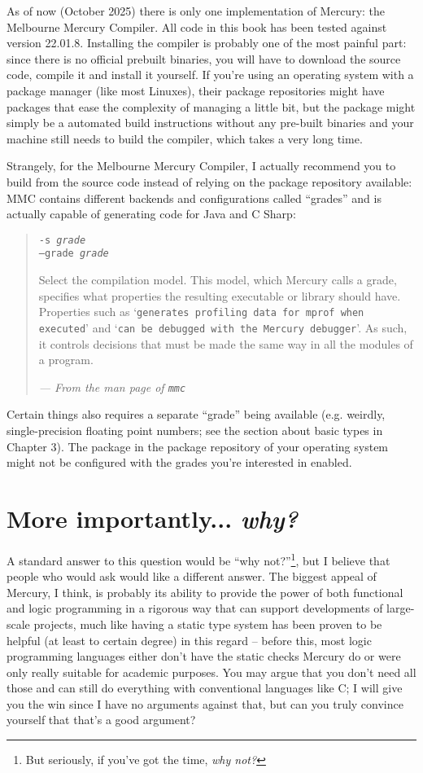 As of now (October 2025) there is only one implementation of Mercury: the Melbourne Mercury Compiler. All code in this book has been tested against version 22.01.8. Installing the compiler is probably one of the most painful part: since there is no official prebuilt binaries, you will have to download the source code, compile it and install it yourself. If you're using an operating system with a package manager (like most Linuxes), their package repositories might have packages that ease the complexity of managing a little bit, but the package might simply be a automated build instructions without any pre-built binaries and your machine still needs to build the compiler, which takes a very long time.

Strangely, for the Melbourne Mercury Compiler, I actually recommend you to build from the source code instead of relying on the package repository available: MMC contains different backends and configurations called ``grades'' and is actually capable of generating code for Java and C Sharp:

\begin{quote}
  \texttt{-s \textit{grade}}\\
  \texttt{--grade \textit{grade}}
  
  Select the compilation model. This model, which Mercury calls a grade, specifies what properties the resulting executable or library should have. Properties such as `\texttt{generates profiling data for mprof when executed}' and `\texttt{can be debugged with the Mercury debugger}'. As such, it controls decisions that must be made the same way in all the modules of a program.

  \textit{--- From the man page of \texttt{mmc}}
\end{quote}

Certain things also requires a separate ``grade'' being available (e.g. weirdly, single-precision floating point numbers; see the section about basic types in Chapter 3). The package in the package repository of your operating system might not be configured with the grades you're interested in enabled.

\section{More importantly... \textit{why?}}

A standard answer to this question would be ``why not?''\footnote{But seriously, if you've got the time, \textit{why not?}}, but I believe that people who would ask would like a different answer. The biggest appeal of Mercury, I think, is probably its ability to provide the power of both functional and logic programming in a rigorous way that can support developments of large-scale projects, much like having a static type system has been proven to be helpful (at least to certain degree) in this regard -- before this, most logic programming languages either don't have the static checks Mercury do or were only really suitable for academic purposes. You may argue that you don't need all those and can still do everything with conventional languages like C; I will give you the win since I have no arguments against that, but can you truly convince yourself that that's a good argument?


